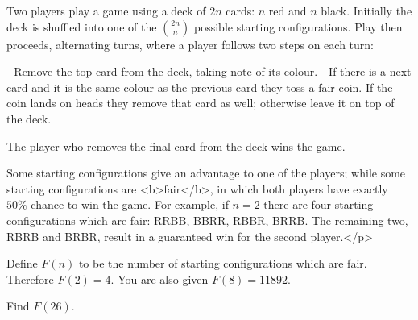 Two players play a game using a deck of $2n$ cards: $n$ red and $n$ black. Initially the deck is shuffled into one of the $\binom{2n}{n}$ possible starting configurations. Play then proceeds, alternating turns, where a player follows two steps on each turn:

- Remove the top card from the deck, taking note of its colour.
- If there is a next card and it is the same colour as the previous card they toss a fair coin. If the coin lands on heads they remove that card as well; otherwise leave it on top of the deck.

The player who removes the final card from the deck wins the game.

Some starting configurations give an advantage to one of the players; while some starting configurations are <b>fair</b>, in which both players have exactly $50\%$ chance to win the game. For example, if $n=2$ there are four starting configurations which are fair: RRBB, BBRR, RBBR, BRRB. The remaining two, RBRB and BRBR, result in a guaranteed win for the second player.</p>

Define $F(n)$ to be the number of starting configurations which are fair. Therefore $F(2)=4$. You are also given $F(8)=11892$.

Find $F(26)$.

